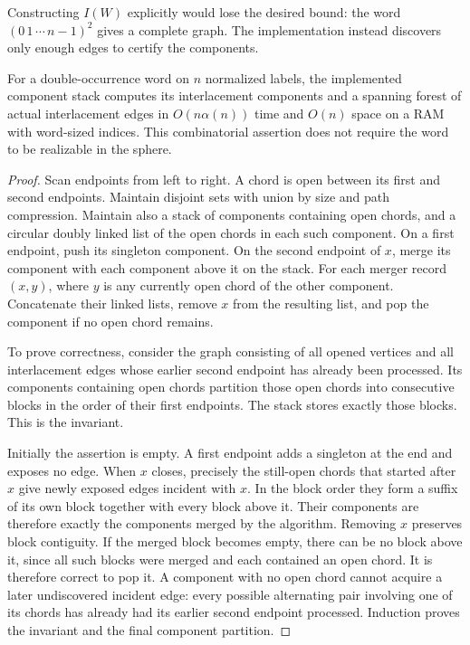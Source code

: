 Constructing $I(W)$ explicitly would lose the desired bound: the word
$(0\,1\,\cdots\,n-1)^2$ gives a complete graph.  The implementation instead
discovers only enough edges to certify the components.

\begin{theorem}
\label{thm:interlace-stack}
For a double-occurrence word on $n$ normalized labels, the implemented
component stack computes its interlacement components and a spanning forest
of actual interlacement edges in $O(n\alpha(n))$ time and $O(n)$ space on a
RAM with word-sized indices.  This combinatorial assertion does not require
the word to be realizable in the sphere.
\end{theorem}

\begin{proof}
Scan endpoints from left to right.  A chord is open between its first and
second endpoints.  Maintain disjoint sets with union by size and path
compression.  Maintain also a stack of components containing open chords,
and a circular doubly linked list of the open chords in each such component.
On a first endpoint, push its singleton component.  On the second endpoint
of $x$, merge its component with each component above it on the stack.
For each merger record $(x,y)$, where $y$ is any currently open chord of
the other component.  Concatenate their linked lists, remove $x$ from the
resulting list, and pop the component if no open chord remains.

To prove correctness, consider the graph consisting of all opened vertices
and all interlacement edges whose earlier second endpoint has already been
processed.  Its components containing open chords partition those open
chords into consecutive blocks in the order of their first endpoints.
The stack stores exactly those blocks.  This is the invariant.

Initially the assertion is empty.  A first endpoint adds a singleton at
the end and exposes no edge.  When $x$ closes, precisely the still-open
chords that started after $x$ give newly exposed edges incident with $x$.
In the block order they form a suffix of its own block together with every
block above it.  Their components are therefore exactly the components
merged by the algorithm.  Removing $x$ preserves block contiguity.  If
the merged block becomes empty, there can be no block above it, since all
such blocks were merged and each contained an open chord.  It is therefore
correct to pop it.  A component with no open chord cannot acquire a later
undiscovered incident edge: every possible alternating pair involving one
of its chords has already had its earlier second endpoint processed.
Induction proves the invariant and the final component partition.


\end{proof}
